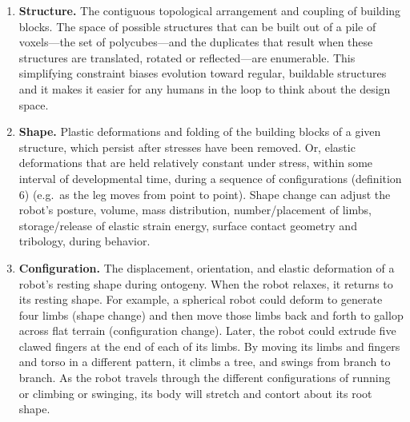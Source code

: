 \begin{enumerate}
    
    \item \textbf{Structure.} The contiguous topological arrangement and coupling of building blocks.
    The space of possible structures that can be built out of a pile of voxels---the set of polycubes---and the duplicates that result when these structures are translated, rotated or reflected---are enumerable.
    This simplifying constraint biases evolution toward regular, buildable structures and it makes it easier for any humans in the loop to think about the design space.
    
    
    \item \textbf{Shape.} Plastic deformations and folding of the building blocks of a given structure, which persist after stresses have been removed.
    Or, elastic deformations that are held relatively constant under stress, within some interval of developmental time, during a sequence of configurations (definition 6) (e.g.~as the leg moves from point to point).
    Shape change can adjust the robot's posture, volume, mass distribution, number/placement of limbs, storage/release of elastic strain energy, surface contact geometry and tribology, during behavior.
    
    
    \item \textbf{Configuration.}
    The 
    displacement, orientation, and elastic deformation of a robot's 
    resting shape
    during ontogeny.
    When the robot relaxes, it returns to its resting shape.
    For example, a spherical robot could deform to generate four limbs (shape change) and then move those limbs back and forth to gallop across flat terrain (configuration change).
    Later, the robot could extrude five clawed fingers at the end of each of its limbs.
    By moving its limbs and fingers and torso in a different pattern, it climbs a tree, and swings from branch to branch.
    As the robot travels through the different configurations of running or climbing or swinging, its body will stretch and contort about its root shape.
    

\end{enumerate}
